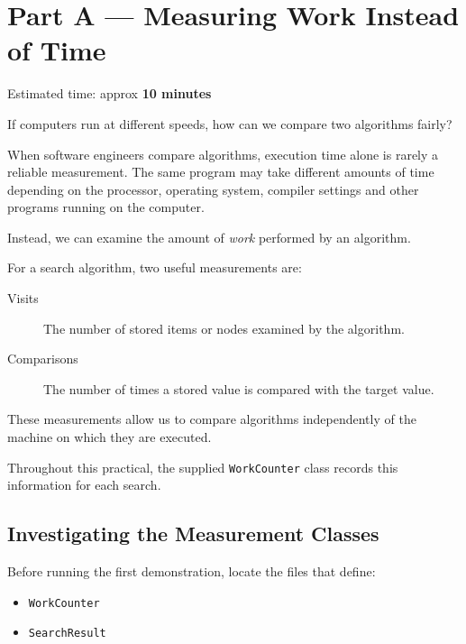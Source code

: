 \documentclass{csc2059practical}
\begin{document}
\section{Part A --- Measuring Work Instead of Time}


\begin{infobox}
Estimated time: approx \textbf{10 minutes}
\end{infobox}


\begin{engineeringquestion}
If computers run at different speeds, how can we compare two algorithms fairly?
\end{engineeringquestion}

When software engineers compare algorithms, execution time alone is rarely a
reliable measurement. The same program may take different amounts of time
depending on the processor, operating system, compiler settings and other
programs running on the computer.

Instead, we can examine the amount of \emph{work} performed by an algorithm.

For a search algorithm, two useful measurements are:

\begin{description}
    \item[Visits] The number of stored items or nodes examined by the algorithm.
    \item[Comparisons] The number of times a stored value is compared with the
          target value.
\end{description}

These measurements allow us to compare algorithms independently of the machine
on which they are executed.

Throughout this practical, the supplied \texttt{WorkCounter} class
records this information for each search.


\subsection{Investigating the Measurement Classes}

Before running the first demonstration, locate the files that define:

\begin{itemize}
    \item \texttt{WorkCounter}
    \item \texttt{SearchResult}
\end{itemize}
\end{document}
